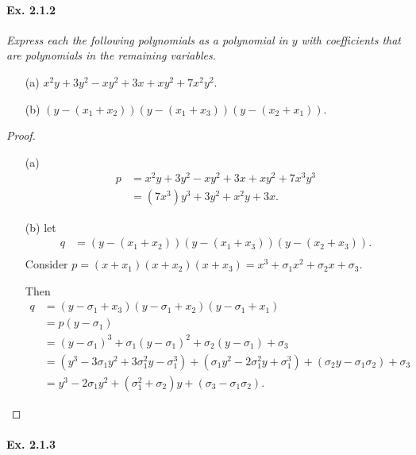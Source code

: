 \documentclass[11pt,a4paper]{article}
\begin{document}
\paragraph{Ex. 2.1.2}

{\it Express each the following polynomials as a polynomial in $y$ with coefficients that are polynomials in the remaining variables.
\begin{enumerate}
\item[(a)] $x^2y + 3y^2 -xy^2 + 3x +xy^2 +7x^2y^2$.
\item[(b)] $(y-(x_1+x_2))(y-(x_1+x_3))(y-(x_2+x_1))$.
\end{enumerate}
}

\begin{proof}
\begin{enumerate}
\item[(a)] 
\begin{align*}
p &= x^2 y + 3 y^2 - x y^2 + 3x + x y^2 + 7 x^3 y^3\\
&= ( 7 x^3) y^3 + 3 y^2 + x^2 y + 3x.
\end{align*}

\item[(b)] 
let 
\begin{align*}
q &= (y -(x_1+x_2))(y-(x_1+x_3))(y-(x_2+x_3)).\\
\end{align*}
Consider $p = (x+x_1)(x+x_2)(x+x_3) = x^3+ \sigma_1x^2+\sigma_2 x +\sigma_3$.

Then
\begin{align*}
q &= (y - \sigma_1 + x_3)(y-\sigma_1+x_2)(y - \sigma_1 + x_1)\\
&=p(y-\sigma_1)\\
&=(y-\sigma_1)^3 + \sigma_1 (y-\sigma_1)^2 + \sigma_2(y-\sigma_1) + \sigma_3\\
&=(y^3 -3 \sigma_1 y^2 + 3 \sigma_1^2 y - \sigma_1^3) + (\sigma_1y^2 - 2 \sigma_1^2y + \sigma_1^3)+ (\sigma_2 y - \sigma_1 \sigma_2) + \sigma_3\\
&=y^3 - 2 \sigma_1 y^2 + (\sigma_1^2+\sigma_2)y + (\sigma_3 - \sigma_1\sigma_2).
\end{align*}
\end{enumerate}
\end{proof}

\paragraph{Ex. 2.1.3}
\end{document}
